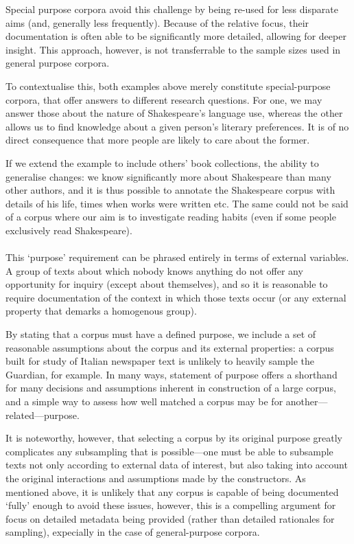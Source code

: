 Special purpose corpora avoid this challenge by being re-used for less disparate aims (and, generally less frequently).  Because of the relative focus, their documentation is often able to be significantly more detailed, allowing for deeper insight.  This approach, however, is not transferrable to the sample sizes used in general purpose corpora.

To contextualise this, both examples above merely constitute special-purpose corpora, that offer answers to different research questions.  For one, we may answer those about the nature of Shakespeare's language use, whereas the other allows us to find knowledge about a given person's literary preferences.  It is of no direct consequence that more people are likely to care about the former.

If we extend the example to include others' book collections, the ability to generalise changes: we know significantly more about Shakespeare than many other authors, and it is thus possible to annotate the Shakespeare corpus with details of his life, times when works were written etc.  The same could not be said of a corpus where our aim is to investigate reading habits (even if some people exclusively read Shakespeare).

\paragraph{}
This `purpose' requirement can be phrased entirely in terms of external variables.
A group of texts about which nobody knows anything do not offer any opportunity for inquiry (except about themselves), and so it is reasonable to require documentation of the context in which those texts occur (or any external property that demarks a homogenous group).

By stating that a corpus must have a defined purpose, we include a set of reasonable assumptions about the corpus and its external properties: a corpus built for study of Italian newspaper text is unlikely to heavily sample the Guardian, for example.  In many ways, statement of purpose offers a shorthand for many decisions and assumptions inherent in construction of a large corpus, and a simple way to assess how well matched a corpus may be for another---related---purpose.

It is noteworthy, however, that selecting a corpus by its original purpose greatly complicates any subsampling that is possible---one must be able to subsample texts not only according to external data of interest, but also taking into account the original interactions and assumptions made by the constructors.  As mentioned above, it is unlikely that any corpus is capable of being documented `fully' enough to avoid these issues, however, this is a compelling argument for focus on detailed metadata being provided (rather than detailed rationales for sampling), expecially in the case of general-purpose corpora.


